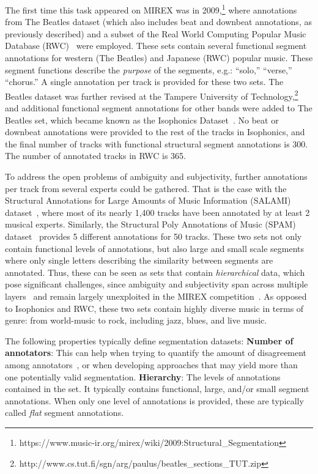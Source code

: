 \documentclass{article}
\begin{document}
The first time this task appeared on MIREX was in 2009,\footnote{https://www.music-ir.org/mirex/wiki/2009:Structural\_Segmentation} where annotations from The Beatles dataset (which also includes beat and downbeat annotations, as previously described) and a subset of the Real World Computing Popular Music Database (RWC)~\cite{Goto2002} were employed.
These sets contain several functional segment annotations for western (The Beatles) and Japanese (RWC) popular music.
These segment functions describe the \emph{purpose} of the segments, e.g.: ``solo,'' ``verse,'' ``chorus.''
A single annotation per track is provided for these two sets.
The Beatles dataset was further revised at the Tampere University of Technology,\footnote{http://www.cs.tut.fi/sgn/arg/paulus/beatles\_sections\_TUT.zip} and additional functional segment annotations for other bands were added to The Beatles set, which became known as the Isophonics Dataset~\cite{Mauch2009a}.
No beat or downbeat annotations were provided to the rest of the tracks in Isophonics, and the final number of tracks with functional structural segment annotations is 300.
The number of annotated tracks in RWC is 365.

To address the open problems of ambiguity and subjectivity, further annotations per track from several experts could be gathered.
That is the case with the Structural Annotations for Large Amounts of Music Information (SALAMI) dataset~\cite{Smith2011}, where most of its nearly 1,400 tracks have been annotated by at least 2 musical experts.
Similarly, the Structural Poly Annotations of Music (SPAM) dataset~\cite{Nieto2016} provides 5 different annotations for 50 tracks.
These two sets not only contain functional levels of annotations, but also large and small scale segments where only single letters describing the similarity between segments are annotated.
Thus, these can be seen as sets that contain \emph{hierarchical} data, which pose significant challenges, since ambiguity and subjectivity span across multiple layers~\cite{McFee2017} and remain largely unexploited in the MIREX competition~\cite{Ehmann2011, Smith2013}.
As opposed to Isophonics and RWC, these two sets contain highly diverse music in terms of genre: from world-music to rock, including jazz, blues, and live music.

The following properties typically define segmentation datasets:
\textbf{Number of annotators}: This can help when trying to quantify the amount of disagreement among annotators~\cite{McFee2017,Nieto2016}, or when developing approaches that may yield more than one potentially valid segmentation.
\textbf{Hierarchy}: The levels of annotations contained in the set. It typically contains functional, large, and/or small segment annotations.
When only one level of annotations is provided, these are typically called \emph{flat} segment annotations.
\end{document}
